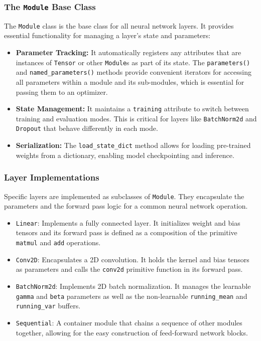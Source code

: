 \documentclass[a4paper]{article}
\begin{document}
\subsubsection{The \texttt{Module} Base Class}

The \texttt{Module} class is the base class for all neural network layers. It provides essential functionality for managing a layer's state and parameters:
\begin{itemize}
    \item \textbf{Parameter Tracking:} It automatically registers any attributes that are instances of \texttt{Tensor} or other \texttt{Module}s as part of its state. The \texttt{parameters()} and \texttt{named\_parameters()} methods provide convenient iterators for accessing all parameters within a module and its sub-modules, which is essential for passing them to an optimizer.
    \item \textbf{State Management:} It maintains a \texttt{training} attribute to switch between training and evaluation modes. This is critical for layers like \texttt{BatchNorm2d} and \texttt{Dropout} that behave differently in each mode.
    \item \textbf{Serialization:} The \texttt{load\_state\_dict} method allows for loading pre-trained weights from a dictionary, enabling model checkpointing and inference.
\end{itemize}

\subsubsection{Layer Implementations}

Specific layers are implemented as subclasses of \texttt{Module}. They encapsulate the parameters and the forward pass logic for a common neural network operation.
\begin{itemize}
    \item \texttt{Linear}: Implements a fully connected layer. It initializes weight and bias tensors and its forward pass is defined as a composition of the primitive \texttt{matmul} and \texttt{add} operations.
    \item \texttt{Conv2D}: Encapsulates a 2D convolution. It holds the kernel and bias tensors as parameters and calls the \texttt{conv2d} primitive function in its forward pass.
    \item \texttt{BatchNorm2d}: Implements 2D batch normalization. It manages the learnable \texttt{gamma} and \texttt{beta} parameters as well as the non-learnable \texttt{running\_mean} and \texttt{running\_var} buffers.
    \item \texttt{Sequential}: A container module that chains a sequence of other modules together, allowing for the easy construction of feed-forward network blocks.
\end{itemize}
\end{document}
